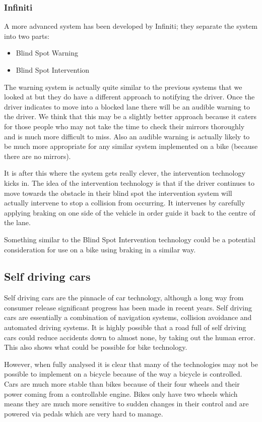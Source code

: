\documentclass[a4paper]{report}
\begin{document}
{\subsubsection{Infiniti}
A more advanced system has been developed by Infiniti; they separate the system into two parts:
\begin{itemize}
\item Blind Spot Warning \cite{infiniti_warning}
\item Blind Spot Intervention \cite{infiniti_intervene}
\end{itemize}
The warning system is actually quite similar to the previous systems that we looked at but they do have a different approach to notifying the driver. Once the driver indicates to move into a blocked lane there will be an audible warning to the driver. We think that this may be a slightly better approach because it caters for those people who may not take the time to check their mirrors thoroughly and is much more difficult to miss. Also an audible warning is actually likely to be much more appropriate for any similar system implemented on a bike (because there are no mirrors).

It is after this where the system gets really clever, the intervention technology kicks in. The idea of the intervention technology is that if the driver continues to move towards the obstacle in their blind spot the intervention system will actually intervene to stop a collision from occurring. It intervenes by carefully applying braking on one side of the vehicle in order guide it back to the centre of the lane.

Something similar to the Blind Spot Intervention technology could be a potential consideration for use on a bike using braking in a similar way.
\subsection{Self driving cars}
Self driving cars are the pinnacle of car technology, although a long way from consumer release significant progress has been made in recent years. Self driving cars are essentially a combination of navigation systems, collision avoidance and automated driving systems. It is highly possible that a road full of self driving cars could reduce accidents down to almost none, by taking out the human error. This also shows what could be possible for bike technology.

However, when fully analysed it is clear that many of the technologies may not be possible to implement on a bicycle because of the way a bicycle is controlled. Cars are much more stable than bikes because of their four wheels and their power coming from a controllable engine. Bikes only have two wheels which means they are much more sensitive to sudden changes in their control and are powered via pedals which are very hard to manage. 

}
\end{document}
